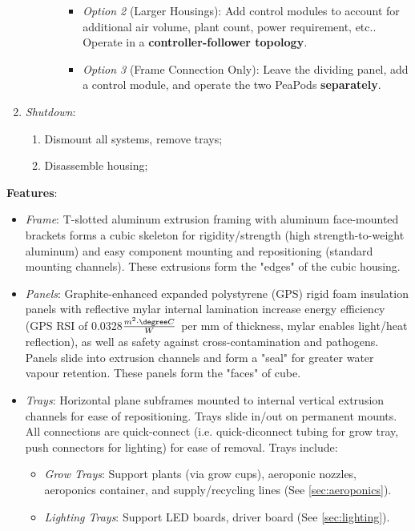 \documentclass{../tex/report}
\begin{document}
\begin{enumerate}
\begin{enumerate}
\begin{enumerate}
\begin{itemize}
                \item \textit{Option 2} (Larger Housings): Add control modules to account for additional air volume, plant count, power requirement, etc.. Operate in a \textbf{controller-follower topology}.
                \item \textit{Option 3} (Frame Connection Only): Leave the dividing panel, add a control module, and operate the two PeaPods \textbf{separately}.
            \end{itemize}
        \end{enumerate}
    \end{enumerate}
    \item \textit{Shutdown}:
    \begin{enumerate}
        \item Dismount all systems, remove trays;
        \item Disassemble housing;
    \end{enumerate}
\end{enumerate}

\newpage

\textbf{Features}:
\begin{itemize}
    \item \textit{Frame}: T-slotted aluminum extrusion framing with aluminum face-mounted brackets forms a cubic skeleton for rigidity/strength (high strength-to-weight aluminum) and easy component mounting and repositioning (standard mounting channels). These extrusions form the "edges" of the cubic housing. %
    \item \textit{Panels}: Graphite-enhanced expanded polystyrene (GPS) rigid foam insulation panels \cite{insulation} with reflective mylar internal lamination increase energy efficiency (GPS RSI of 0.0328$\frac{m^2 \cdot \degree C}{W}$ per mm of thickness, mylar enables light/heat reflection), as well as safety against cross-contamination and pathogens. Panels slide into extrusion channels and form a "seal" for greater water vapour retention. These panels form the "faces" of cube. %
    \item \textit{Trays}: Horizontal plane subframes mounted to internal vertical extrusion channels for ease of repositioning. Trays slide in/out on permanent mounts. All connections are quick-connect (i.e. quick-diconnect tubing for grow tray, push connectors for lighting) for ease of removal. Trays include:
    \begin{itemize}
        \item \textit{Grow Trays}: Support plants (via grow cups), aeroponic nozzles, aeroponics container, and supply/recycling lines (See \ref{sec:aeroponics}).
        \item \textit{Lighting Trays}: Support LED boards, driver board (See \ref{sec:lighting}).
    \end{itemize}
\end{itemize}
\end{document}

